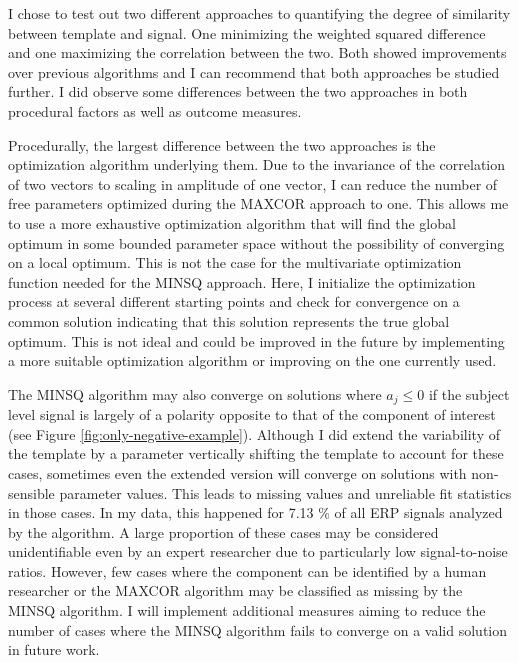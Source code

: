 \documentclass[
  man]{apa7}
\begin{document}
I chose to test out two different approaches to quantifying the degree of similarity between template and signal. One minimizing the weighted squared difference and one maximizing the correlation between the two. Both showed improvements over previous algorithms and I can recommend that both approaches be studied further. I did observe some differences between the two approaches in both procedural factors as well as outcome measures.

Procedurally, the largest difference between the two approaches is the optimization algorithm underlying them. Due to the invariance of the correlation of two vectors to scaling in amplitude of one vector, I can reduce the number of free parameters optimized during the MAXCOR approach to one. This allows me to use a more exhaustive optimization algorithm that will find the global optimum in some bounded parameter space without the possibility of converging on a local optimum. This is not the case for the multivariate optimization function needed for the MINSQ approach. Here, I initialize the optimization process at several different starting points and check for convergence on a common solution indicating that this solution represents the true global optimum. This is not ideal and could be improved in the future by implementing a more suitable optimization algorithm or improving on the one currently used.

The MINSQ algorithm may also converge on solutions where \(a_j \le 0\) if the subject level signal is largely of a polarity opposite to that of the component of interest (see Figure \ref{fig:only-negative-example}). Although I did extend the variability of the template by a parameter vertically shifting the template to account for these cases, sometimes even the extended version will converge on solutions with non-sensible parameter values. This leads to missing values and unreliable fit statistics in those cases. In my data, this happened for 7.13 \% of all ERP signals analyzed by the algorithm. A large proportion of these cases may be considered unidentifiable even by an expert researcher due to particularly low signal-to-noise ratios. However, few cases where the component can be identified by a human researcher or the MAXCOR algorithm may be classified as missing by the MINSQ algorithm. I will implement additional measures aiming to reduce the number of cases where the MINSQ algorithm fails to converge on a valid solution in future work.
\end{document}
